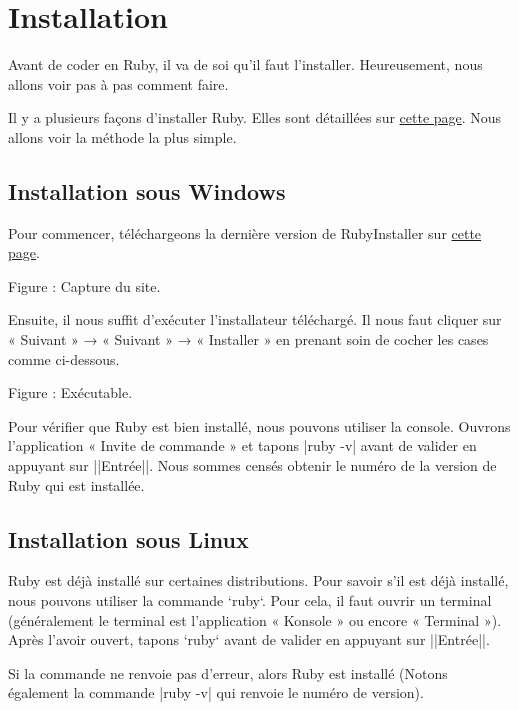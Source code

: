 \section{Installation}

Avant de coder en Ruby, il va de soi qu’il faut l’installer. Heureusement, nous allons voir pas à pas comment faire.

\begin{Information}
Il y a plusieurs façons d’installer Ruby. Elles sont détaillées sur \href{https://www.ruby-lang.org/fr/downloads/}{cette page}. Nous allons voir la méthode la plus simple.
\end{Information}

\subsection{Installation sous Windows}

Pour commencer, téléchargeons la dernière version de RubyInstaller sur \href{https://www.ruby-lang.org/fr/downloads/}{cette page}.

Figure : Capture du site.

Ensuite, il nous suffit d’exécuter l’installateur téléchargé.  
Il nous faut cliquer sur « Suivant » → « Suivant » → « Installer » en prenant soin de cocher les cases comme ci-dessous.

Figure : Exécutable.

Pour vérifier que Ruby est bien installé, nous pouvons utiliser la console. Ouvrons l’application « Invite de commande » et tapons \codeinline|ruby -v| avant de valider en appuyant sur ||Entrée||. Nous sommes censés obtenir le numéro de la version de Ruby qui est installée.
 
\subsection{Installation sous Linux}

Ruby est déjà installé sur certaines distributions. Pour savoir s’il est déjà installé, nous pouvons utiliser la commande \codeinline`ruby`. Pour cela, il faut ouvrir un terminal (généralement le terminal est l’application « Konsole » ou encore « Terminal »). Après l’avoir ouvert, tapons \codeinline`ruby` avant de valider en appuyant sur ||Entrée||.

Si la commande ne renvoie pas d’erreur, alors Ruby est installé (Notons également la commande \codeinline|ruby -v| qui renvoie le numéro de version). 

